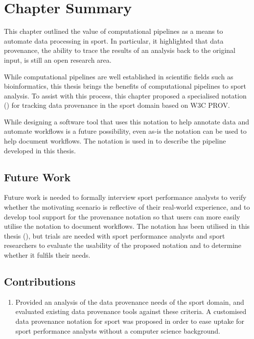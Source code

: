 \section{Chapter Summary}

This chapter outlined the value of computational pipelines as a means to automate data processing in sport. In particular, it highlighted that data provenance, the ability to trace the results of an analysis back to the original input, is still an open research area.

While computational pipelines are well established in scientific fields such as bioinformatics, this thesis brings the benefits of computational pipelines to sport analysis. To assist with this process, this chapter proposed a specialised notation () for tracking data provenance in the sport domain based on W3C PROV.

While designing a software tool that uses this notation to help annotate data and automate workflows is a future possibility, even as-is the notation can be used to help document workflows. The notation is used in  to describe the pipeline developed in this thesis.

\pagebreak{}

\subsection*{Future Work}


Future work is needed to formally interview sport performance analysts to verify whether the motivating scenario is reflective of their real-world experience, and to develop tool support for the provenance notation so that users can more easily utilise the notation to document workflows. The notation has been utilised in this thesis (), but trials are needed with sport performance analysts and sport researchers to evaluate the usability of the proposed notation and to determine whether it fulfils their needs.

\subsection*{Contributions}

\begin{enumerate}
  \item Provided an analysis of the data provenance needs of the sport domain, and evaluated existing data provenance tools against these criteria. A customised data provenance notation for sport was proposed in order to ease uptake for sport performance analysts without a computer science background.
\end{enumerate}
